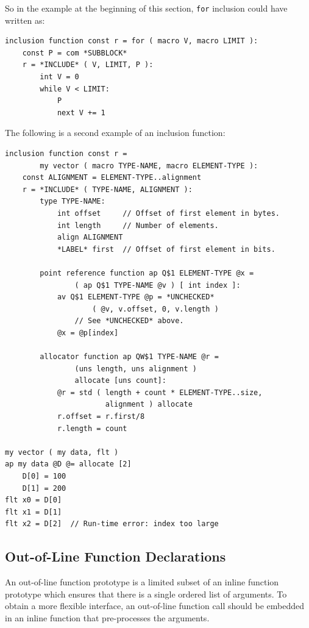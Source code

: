 \documentclass[12pt]{article}
\newenvironment{indpar}[1][0.3in]%
	{\begin{list}{}%
		     {\setlength{\itemsep}{0in}%
		      \setlength{\topsep}{0in}%
		      \setlength{\parsep}{1ex}%
		      \setlength{\labelwidth}{#1}%
		      \setlength{\leftmargin}{#1}%
		      \addtolength{\leftmargin}{\labelsep}}%
	 \item}%
	{\end{list}}
\begin{document}
So in the example at the beginning of this section,
{\tt for} inclusion could have written as:
\begin{indpar}[1em]\begin{verbatim}
inclusion function const r = for ( macro V, macro LIMIT ):
    const P = com *SUBBLOCK*
    r = *INCLUDE* ( V, LIMIT, P ):
        int V = 0
        while V < LIMIT:
            P
            next V += 1
\end{verbatim}\end{indpar}

The following is a second example of an inclusion function:
\begin{indpar}[1em]\begin{verbatim}
inclusion function const r =
        my vector ( macro TYPE-NAME, macro ELEMENT-TYPE ):
    const ALIGNMENT = ELEMENT-TYPE..alignment
    r = *INCLUDE* ( TYPE-NAME, ALIGNMENT ):
        type TYPE-NAME:
            int offset     // Offset of first element in bytes.
            int length     // Number of elements.
            align ALIGNMENT
            *LABEL* first  // Offset of first element in bits.

        point reference function ap Q$1 ELEMENT-TYPE @x =
                ( ap Q$1 TYPE-NAME @v ) [ int index ]:
            av Q$1 ELEMENT-TYPE @p = *UNCHECKED*
                    ( @v, v.offset, 0, v.length )
                // See *UNCHECKED* above.
            @x = @p[index]

        allocator function ap QW$1 TYPE-NAME @r =
                (uns length, uns alignment )
                allocate [uns count]:
            @r = std ( length + count * ELEMENT-TYPE..size,
                       alignment ) allocate
            r.offset = r.first/8
            r.length = count

my vector ( my data, flt )
ap my data @D @= allocate [2]
    D[0] = 100
    D[1] = 200
flt x0 = D[0]
flt x1 = D[1]
flt x2 = D[2]  // Run-time error: index too large
\end{verbatim}\end{indpar}


\subsection{Out-of-Line Function Declarations}
\label{OUT-OF-LINE-FUNCTION-DECLARATIONS}

An out-of-line function prototype is a limited subset of
an inline function prototype which ensures that there is
a single ordered list of arguments.  To obtain a more
flexible interface, an out-of-line function call should
be embedded in an inline function that pre-processes the
arguments.
\end{document}
